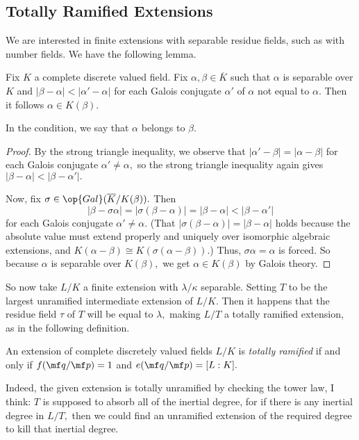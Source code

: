 \subsection{Totally Ramified Extensions}
We are interested in finite extensions with separable residue fields, such as with number fields. We have the following lemma.
\begin{lem}[Krasner's]
	Fix $K$ a complete discrete valued field. Fix $\alpha,\beta\in\overline K$ such that $\alpha$ is separable over $K$ and $|\beta-\alpha|<|\alpha'-\alpha|$ for each Galois conjugate $\alpha'$ of $\alpha$ not equal to $\alpha.$ Then it follows $\alpha\in K(\beta).$
\end{lem}
\begin{remark}
	In the condition, we say that $\alpha$ belongs to $\beta.$
\end{remark}
\begin{proof}
	By the strong triangle inequality, we observe that $|\alpha'-\beta|=|\alpha-\beta|$ for each Galois conjugate $\alpha'\ne\alpha,$ so the strong triangle inequality again gives $|\beta-\alpha|<|\beta-\alpha'|.$

	Now, fix $\sigma\in\op{Gal}(\overline K/K(\beta)).$ Then
	\[|\beta-\sigma\alpha|=|\sigma(\beta-\alpha)|=|\beta-\alpha|<|\beta-\alpha'|\]
	for each Galois conjugate $\alpha'\ne\alpha.$ (That $|\sigma(\beta-\alpha)|=|\beta-\alpha|$ holds because the absolute value must extend properly and uniquely over isomorphic algebraic extensions, and $K(\alpha-\beta)\cong K(\sigma(\alpha-\beta)).$) Thus, $\sigma\alpha=\alpha$ is forced. So because $\alpha$ is separable over $K(\beta),$ we get $\alpha\in K(\beta)$ by Galois theory.
\end{proof}
So now take $L/K$ a finite extension with $\lambda/\kappa$ separable. Setting $T$ to be the largest unramified intermediate extension of $L/K.$ Then it happens that the residue field $\tau$ of $T$ will be equal to $\lambda,$ making $L/T$ a totally ramified extension, as in the following definition.
\begin{definition}
	An extension of complete discretely valued fields $L/K$ is \textit{totally ramified} if and only if $f(\mf q/\mf p)=1$ and $e(\mf q/\mf p)=[L:K].$
\end{definition}
Indeed, the given extension is totally unramified by checking the tower law, I think: $T$ is supposed to absorb all of the inertial degree, for if there is any inertial degree in $L/T,$ then we could find an unramified extension of the required degree to kill that inertial degree.

